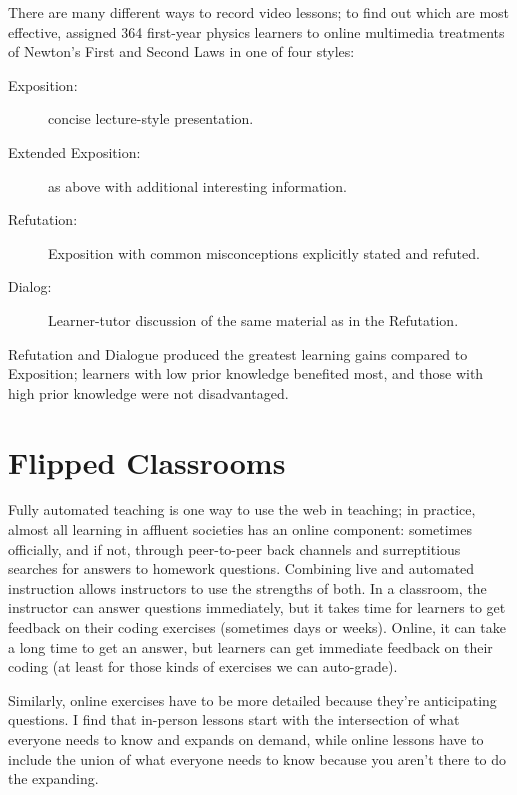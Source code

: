 There are many different ways to record video lessons; to find out
which are most effective, \cite{Mull2007a} assigned 364 first-year
physics learners to online multimedia treatments of Newton's First and
Second Laws in one of four styles:

\begin{description}

\item[Exposition:] concise lecture-style presentation.

\item[Extended Exposition:] as above with additional interesting
  information.

\item[Refutation:] Exposition with common misconceptions explicitly
  stated and refuted.

\item[Dialog:] Learner-tutor discussion of the same material as in
  the Refutation.

\end{description}

Refutation and Dialogue produced the greatest learning gains compared
to Exposition; learners with low prior knowledge benefited most, and
those with high prior knowledge were not disadvantaged.

\section{Flipped Classrooms}\label{s:online-flipped}

Fully automated teaching is one way to use the web in teaching; in
practice, almost all learning in affluent societies has an online
component: sometimes officially, and if not, through peer-to-peer back
channels and surreptitious searches for answers to homework questions.
Combining live and automated instruction allows instructors to use the
strengths of both.  In a classroom, the instructor can answer
questions immediately, but it takes time for learners to get feedback
on their coding exercises (sometimes days or weeks). Online, it can
take a long time to get an answer, but learners can get immediate
feedback on their coding (at least for those kinds of exercises we can
auto-grade).

Similarly, online exercises have to be more detailed because they're
anticipating questions.  I find that in-person lessons start with the
intersection of what everyone needs to know and expands on demand,
while online lessons have to include the union of what everyone needs
to know because you aren't there to do the expanding.

